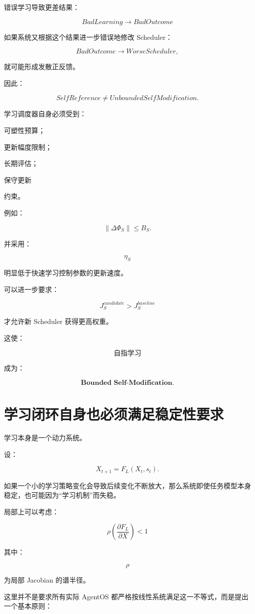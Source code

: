 错误学习导致更差结果：

\[
BadLearning
\rightarrow
BadOutcome
\]

如果系统又根据这个结果进一步错误地修改 Scheduler：

\[
BadOutcome
\rightarrow
WorseScheduler,
\]

就可能形成发散正反馈。

因此：

\[
\boxed{
SelfReference
\neq
UnboundedSelfModification.
}
\]

学习调度器自身必须受到：

可塑性预算；

更新幅度限制；

长期评估；

保守更新

约束。

例如：

\[
\boxed{
\|
\Delta\Phi_S
\|
\le
B_S.
}
\]

并采用：

\[
\eta_S
\]

明显低于快速学习控制参数的更新速度。

可以进一步要求：

\[
J_S^{candidate}
>
J_S^{baseline}
\]

才允许新 Scheduler 获得更高权重。

这使：

\[
\boxed{
\text{自指学习}
}
\]

成为：

\[
\boxed{
\textbf{Bounded Self-Modification}.
}
\]


\section{学习闭环自身也必须满足稳定性要求}

学习本身是一个动力系统。

设：

\[
X_{t+1}
=
F_L(X_t,s_t).
\]

如果一个小的学习策略变化会导致后续变化不断放大，那么系统即使任务模型本身稳定，也可能因为“学习机制”而失稳。

局部上可以考虑：

\[
\boxed{
\rho
\left(
\frac{\partial F_L}
{\partial X}
\right)
<1
}
\]

其中：

\[
\rho
\]

为局部 Jacobian 的谱半径。

这里并不是要求所有实际 AgentOS 都严格按线性系统满足这一不等式，而是提出一个基本原则：

